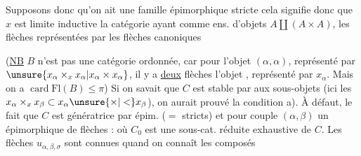 Supposons donc qu'on ait une famille épimorphique stricte
cela signifie donc que $x$ est limite inductive   la catégorie  ayant comme ens. d'objets $A\amalg(A\times A)$, les flèches   représentées par les flèches canoniques

(\uline{NB} $B$ n'est pas une catégorie ordonnée, car pour l'objet $(\alpha,\alpha)$, représenté par $\unsure{x_\alpha\times_x x_\alpha|x_\alpha\times x_\alpha}$, il y a \uline{deux} flèches  l'objet \deleted{$\unsure{\alpha}$}, représenté par $x_\alpha$.\unsure{)|\}} Mais on a  $\operatorname{card}\mathrm{Fl}(B)\leq\pi$) Si on savait que $C$ est stable par   aux sous-objets (ici les $x_\alpha\times_x x_\beta\subset x_\alpha\unsure{\times|<}x_\beta$), on aurait prouvé la condition a). À défaut,    le fait que $C$ est génératrice par épim. ($=$ stricts) et  pour  couple $(\alpha,\beta)$ un   épimorphique de flèches :
où $C_0$ est une sous-cat. réduite exhaustive de $C$. Les flèches $u_{\alpha,\beta,\sigma}$ sont connues quand on connaît les composés

